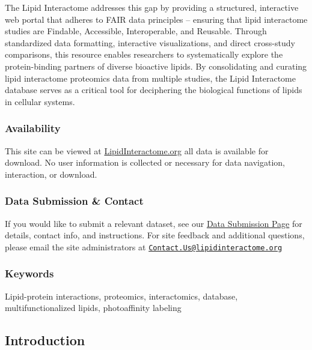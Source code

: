 \documentclass[
  letterpaper,
  DIV=11,
  numbers=noendperiod]{scrartcl}
\begin{document}
The Lipid Interactome addresses this gap by providing a structured,
interactive web portal that adheres to FAIR data principles -- ensuring
that lipid interactome studies are Findable, Accessible, Interoperable,
and Reusable. Through standardized data formatting, interactive
visualizations, and direct cross-study comparisons, this resource
enables researchers to systematically explore the protein-binding
partners of diverse bioactive lipids. By consolidating and curating
lipid interactome proteomics data from multiple studies, the Lipid
Interactome database serves as a critical tool for deciphering the
biological functions of lipids in cellular systems.

\subsubsection{Availability}\label{availability}

This site can be viewed at
\href{lipidinteractome.org}{LipidInteractome.org} all data is available
for download. No user information is collected or necessary for data
navigation, interaction, or download.

\subsubsection{Data Submission \&
Contact}\label{data-submission-contact}

If you would like to submit a relevant dataset, see our
\href{https://lipidinteractome.org/contactus/datasubmission}{Data
Submission Page} for details, contact info, and instructions. For site
feedback and additional questions, please email the site administrators
at
\href{mailto:Contact.Us@lipidinteractome.org}{\nolinkurl{Contact.Us@lipidinteractome.org}}

\subsubsection{Keywords}\label{keywords}

Lipid-protein interactions, proteomics, interactomics, database,
multifunctionalized lipids, photoaffinity labeling

\subsection{Introduction}\label{introduction}
\end{document}

